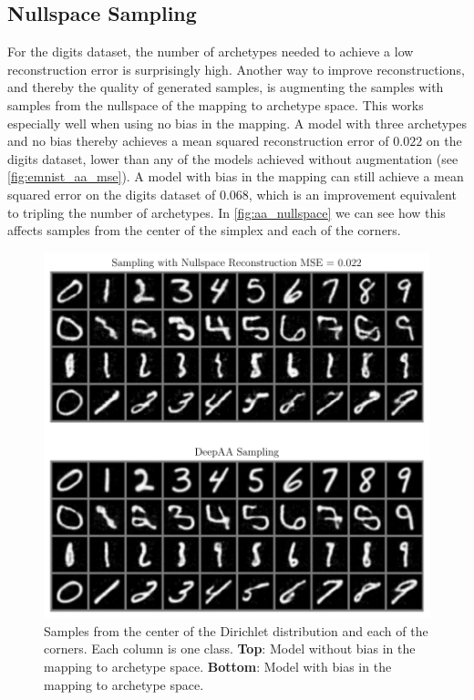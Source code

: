 \subsection{Nullspace Sampling}%
\label{sub:nullspace_sampling}

For the digits dataset, the number of archetypes needed to achieve a low
reconstruction error is surprisingly high. Another way to improve
reconstructions, and thereby the quality of generated samples, is augmenting the
samples with samples from the nullspace of the mapping to archetype space. This
works especially well when using no bias in the mapping. A model with three
archetypes and no bias thereby achieves a mean squared reconstruction error of
$0.022$ on the digits dataset, lower than any of the models achieved without augmentation
(see \autoref{fig:emnist_aa_mse}). A model with bias in the mapping can still
achieve a mean squared error on the digits dataset of $0.068$, which is an improvement
equivalent to tripling the number of archetypes. In \autoref{fig:aa_nullspace}
we can see how this affects samples from the center of the simplex and each of
the corners.
\begin{figure}[htpb]
	\centering
		\includegraphics{figures/samples/aa_nullspace.pdf}
	\caption{Samples from the center of the Dirichlet distribution and each
		of the corners. Each column is one class. \textbf{Top}: Model without bias in
		the mapping to archetype space. \textbf{Bottom}: Model with bias in the mapping to
		archetype space.}%
	\label{fig:aa_nullspace}
\end{figure}
